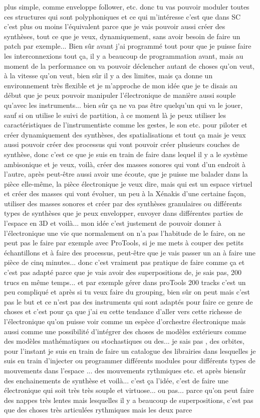 plus simple, comme enveloppe follower, etc. donc tu vas pouvoir moduler toutes ces structures qui sont polyphoniques et ce qui m'intéresse c'est que dans SC c'est plus ou moins l'équivalent parce que je vais pouvoir aussi créer des synthèses, tout ce que je veux, dynamiquement, sans avoir besoin de faire un patch par exemple... Bien sûr avant j'ai programmé tout pour que je puisse faire les interconnexions tout ça, il y a beaucoup de programmation avant, mais au moment de la performance on va pouvoir déclencher autant de choses qu'on veut, à la vitesse qu'on veut, bien sûr il y a des limites, mais ça donne un environnement très flexible et je m'approche de mon idée que je te disais au début que je peux pouvoir manipuler l'électronique de manière aussi souple qu'avec les instruments... bien sûr ça ne va pas être quelqu'un qui va le jouer, sauf si on utilise le suivi de partition, à ce moment là je peux utiliser les caractéristiques de l'instrumentiste comme les gestes, le son etc. pour piloter et créer dynamiquement des synthèses, des spatialisations et tout ça mais je veux aussi pouvoir créer des processus qui vont pouvoir créer plusieurs couches de synthèse, donc c'est ce que je suis en train de faire dans lequel il y a le système ambisonique et je veux, voilà, créer des masses sonores qui vont d'un endroit à l'autre, après peut-être aussi avoir une écoute, que je puisse me balader dans la pièce elle-même, la pièce électronique je veux dire, mais qui est un espace virtuel et créer des masses qui vont évoluer, un peu à la Xénakis d'une certaine façon, utiliser des masses sonores et créer par des synthèses granulaires ou différents types de synthèses que je peux envelopper, envoyer dans différentes parties de l'espace en 3D et voilà... mon idée c'est justement de pouvoir donner à l'électronique une vie que normalement on n'a pas l'habitude de le faire, on ne peut pas le faire par exemple avec ProTools, si je me mets à couper des petits échantillons et à faire des processus, peut-être que je vais passer un an à faire une pièce de cinq minutes... donc c'est vraiment pas pratique de faire comme ça et c'est pas adapté parce que je vais avoir des superpositions de, je sais pas, 200 trucs en même temps... et par exemple gérer dans proTools 200 tracks c'est un peu compliqué et après si tu veux faire du grouping, bien sûr on peut mais c'est pas le but et ce n'est pas des instruments qui sont adaptés pour faire ce genre de choses et c'est pour ça que j'ai eu cette tendance d'aller vers cette richesse de l'électronique qu'on puisse voir comme un espèce d'orchestre électronique mais aussi comme une possibilité d'intégrer des choses de modèles extérieurs comme des modèles mathématiques ou stochastiques ou des... je sais pas , des orbites, pour l'instant je suis en train de faire un catalogue des librairies dans lesquelles je suis en train d'injecter ou programmer différents modules pour différents types de mouvements dans l'espace ... des mouvements rythmiques etc. et après biensûr des enchainements de synthèse et voilà... c'est ça l'idée, c'est de faire une électronique qui soit très très souple et virtuose... ou pas... parce qu'on peut faire des nappes très lentes mais lesquelles il y a beaucoup de superpositions, c'est pas que des choses très articulées rythmiques mais les deux parce 